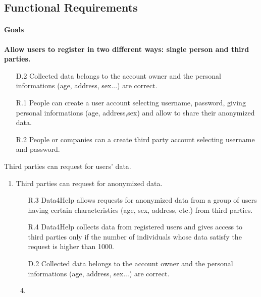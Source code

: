 \documentclass[a4paper]{article}
\begin{document}
\subsection{Functional Requirements}

\paragraph{Goals}

\begin{enumerate}[label*={[G.\arabic*]}]
	
	
	\item \textbf{Allow users to register in two different ways: single person and third parties.}
	
	\begin{enumerate}
	    
	    \item [D.2] Collected data belongs to the account owner and the personal informations (age, address, sex...) are correct.
	    \item [R.1] People can create a user account selecting username, password, giving personal informations (age, address,sex) and allow to share their anonymized data.
	    \item [R.2] People or companies can a create third party account selecting username and password.
	    
	\end{enumerate}
	
	\item Third parties can request for users' data.
	    
	    \begin{enumerate}[label*=.\arabic*]
	        \item Third parties can request for anonymized data.
	        
	            \begin{enumerate}
	                
	                \item [R.3] Data4Help allows requests for anonymized data from a group of users having certain characteristics (age, sex, address, etc.) from third parties.
	                \item [R.4] Data4Help collects data from registered users and gives access to third parties only if the number of individuals whose data satisfy the request is higher than 1000.
	                \item [D.2] Collected data belongs to the account owner and the personal informations (age, address, sex...) are correct.
	                \item 
	                

\end{enumerate}
\end{enumerate}
\end{enumerate}
\end{document}
